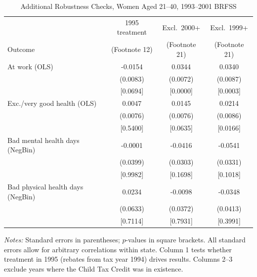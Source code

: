 \begin{table}[htbp]
\centering
\caption{Additional Robustness Checks, Women Aged 21--40, 1993--2001 BRFSS}
\begin{tabular}{lccc}
\toprule
 & 1995 treatment & Excl.\ 2000+ & Excl.\ 1999+ \\
Outcome & (Footnote 12) & (Footnote 21) & (Footnote 21) \\
\midrule
At work (OLS) & -0.0154 & 0.0344 & 0.0340 \\
 & (0.0083) & (0.0072) & (0.0087) \\
 & [0.0694] & [0.0000] & [0.0003] \\
\addlinespace
Exc./very good health (OLS) & 0.0047 & 0.0145 & 0.0214 \\
 & (0.0076) & (0.0076) & (0.0086) \\
 & [0.5400] & [0.0635] & [0.0166] \\
\addlinespace
Bad mental health days (NegBin) & -0.0001 & -0.0416 & -0.0541 \\
 & (0.0399) & (0.0303) & (0.0331) \\
 & [0.9982] & [0.1698] & [0.1018] \\
\addlinespace
Bad physical health days (NegBin) & 0.0234 & -0.0098 & -0.0348 \\
 & (0.0633) & (0.0372) & (0.0413) \\
 & [0.7114] & [0.7931] & [0.3991] \\
\bottomrule
\end{tabular}
\begin{minipage}{\linewidth}
\smallskip\footnotesize
\textit{Notes:} Standard errors in parentheses; $p$-values in square brackets.
 All standard errors allow for arbitrary correlations within state.
 Column 1 tests whether treatment in 1995 (rebates from tax year 1994) drives results.
 Columns 2--3 exclude years where the Child Tax Credit was in existence.
\end{minipage}
\end{table}
